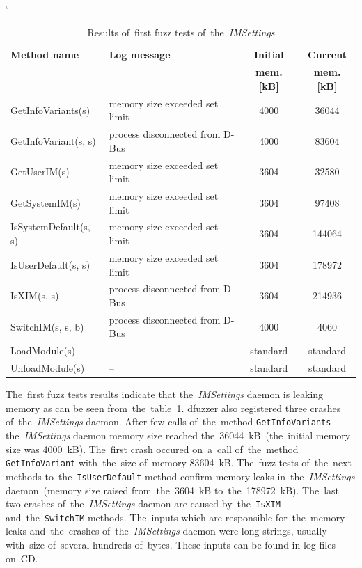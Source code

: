 \FloatBarrier
\begin{table}[h!]
\catcode`
\caption{Results of~first fuzz tests of~the~\emph{IMSettings}}
\label{tab:tab4}
\begin{center}
	\begin{tabular}{| l | l | c | c |}
	\hline
	\textbf{Method name} & \textbf{Log message} & \textbf{Initial} & \textbf{Current} \\
	& & \textbf{mem. [kB]} & \textbf{mem. [kB]} \\ \hline
	GetInfoVariants(s) & memory size exceeded set limit & 4000 & 36044 \\ \hline
	GetInfoVariant(s, s) & process disconnected from D-Bus & 4000 & 83604 \\ \hline
	GetUserIM(s) & memory size exceeded set limit & 3604 & 32580 \\ \hline
	GetSystemIM(s) & memory size exceeded set limit & 3604 & 97408 \\ \hline
	IsSystemDefault(s, s) & memory size exceeded set limit & 3604 & 144064 \\ \hline
	IsUserDefault(s, s) & memory size exceeded set limit & 3604 & 178972 \\ \hline
	IsXIM(s, s) & process disconnected from D-Bus & 3604 & 214936 \\ \hline
	SwitchIM(s, s, b) & process disconnected from D-Bus & 4000 & 4060 \\ \hline
	LoadModule(s) & -- & standard & standard \\ \hline
	UnloadModule(s) & -- & standard & standard \\
	\hline
	\end{tabular}
\end{center}
\end{table}
\FloatBarrier


The~first fuzz tests results indicate that the~\emph{IMSettings} daemon is leaking
memory as can be seen from~the~table~\ref{tab:tab4}. dfuzzer also registered three
crashes of~the~\emph{IMSettings} daemon. After few calls of~the~method
\texttt{GetInfoVariants} the~\emph{IMSettings} daemon memory size reached
the~36044~kB~(the~initial memory size was 4000~kB). The~first crash occured
on~a~call of~the~method \texttt{GetInfoVariant} with~the~size of~memory 83604~kB.
The~fuzz tests of~the~next methods to~the~\texttt{IsUserDefault} method confirm
memory leaks in~the~\emph{IMSettings} daemon~(memory size raised from~the~3604~kB
to~the~178972~kB). The~last two crashes of~the~\emph{IMSettings} daemon are caused
by~the~\texttt{IsXIM} and~the~\texttt{SwitchIM} methods. The~inputs which are
responsible for~the~memory leaks and~the~crashes of~the~\emph{IMSettings} daemon
were long strings, usually with~size of~several hundreds of~bytes. These inputs
can be found in log files on~CD.\\

